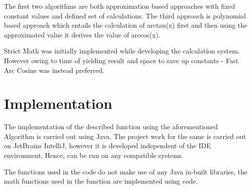 \documentclass[a4paper,12pt]{article}
\begin{document}
    The first two algorithms are both approximation based approaches with fixed constant values and defined set of calculations. The third approach is polynomial based approach which entails the calculation of arctan(x) first and then using the approximated value it derives the value of arccos(x).
    
    Strict Math was initially implemented while developing the calculation system. However owing to time of yielding result and space to save up constants - Fast Arc Cosine was instead preferred.

\section{Implementation}
The implementation of the described function using the aforementioned Algorithm is carried out using Java. The project work for the same is carried out on JetBrains IntelliJ, however it is developed independent of the IDE environment. Hence, can be run on any compatible systems.

The functions used in the code do not make use of any Java in-built libraries, the math functions used in the function are implemented using code. 
\end{document}
